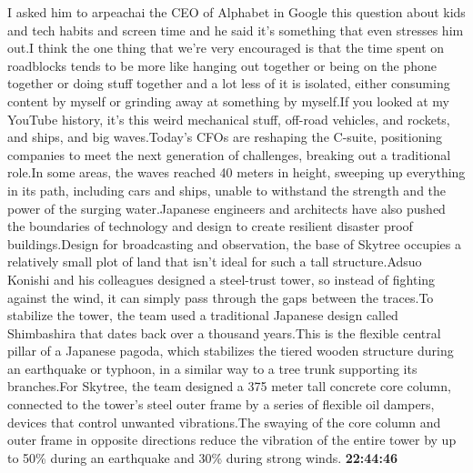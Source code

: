 \documentclass{article}%
\begin{document}
I asked him to arpeachai the CEO of Alphabet in Google this question about kids and tech habits and screen time and he said it's something that even stresses him out.I think the one thing that we're very encouraged is that the time spent on roadblocks tends to be more like hanging out together or being on the phone together or doing stuff together and a lot less of it is isolated, either consuming content by myself or grinding away at something by myself.If you looked at my YouTube history, it's this weird mechanical stuff, off{-}road vehicles, and rockets, and ships, and big waves.Today's CFOs are reshaping the C{-}suite, positioning companies to meet the next generation of challenges, breaking out a traditional role.In some areas, the waves reached 40 meters in height, sweeping up everything in its path, including cars and ships, unable to withstand the strength and the power of the surging water.Japanese engineers and architects have also pushed the boundaries of technology and design to create resilient disaster proof buildings.Design for broadcasting and observation, the base of Skytree occupies a relatively small plot of land that isn't ideal for such a tall structure.Adsuo Konishi and his colleagues designed a steel{-}trust tower, so instead of fighting against the wind, it can simply pass through the gaps between the traces.To stabilize the tower, the team used a traditional Japanese design called Shimbashira that dates back over a thousand years.This is the flexible central pillar of a Japanese pagoda, which stabilizes the tiered wooden structure during an earthquake or typhoon, in a similar way to a tree trunk supporting its branches.For Skytree, the team designed a 375 meter tall concrete core column, connected to the tower's steel outer frame by a series of flexible oil dampers, devices that control unwanted vibrations.The swaying of the core column and outer frame in opposite directions reduce the vibration of the entire tower by up to 50\% during an earthquake and 30\% during strong winds.%
\textbf{22:44:46}%
\end{document}
